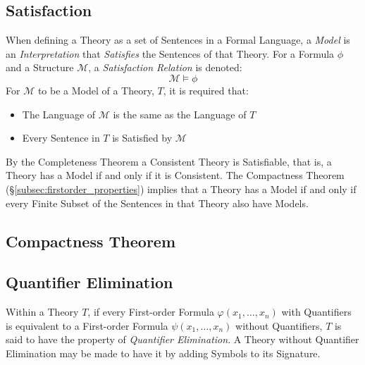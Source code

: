 \subsection{Satisfaction}\label{subsec:satisfaction}

When defining a Theory as a set of Sentences in a Formal Language, a
\emph{Model} is an \emph{Interpretation} that \emph{Satisfies} the
Sentences of that Theory. For a Formula $\phi$ and a Structure
$\mathcal{M}$, a \emph{Satisfaction Relation} is denoted:
\[
    \mathcal{M} \vDash \phi
\]
For $\mathcal{M}$ to be a Model of a Theory, $T$, it is required that:
\begin{itemize}
\item The Language of $\mathcal{M}$ is the same as the Language of $T$
\item Every Sentence in $T$ is Satisfied by $\mathcal{M}$
\end{itemize}
By the Completeness Theorem a Consistent Theory is Satisfiable, that
is, a Theory has a Model if and only if it is Consistent. The
Compactness Theorem (\S\ref{subsec:firstorder_properties}) implies
that a Theory has a Model if and only if every Finite Subset of the
Sentences in that Theory also have Models.



\subsection{Compactness Theorem}


\subsection{Quantifier Elimination}

Within a Theory $T$, if every First-order Formula $\varphi(x_1,
\ldots, x_n)$ with Quantifiers is equivalent to a First-order Formula
$\psi(x_1, \ldots, x_n)$ without Quantifiers, $T$ is said to have the
property of \emph{Quantifier Elimination}. A Theory without Quantifier
Elimination may be made to have it by adding Symbols to its Signature.

